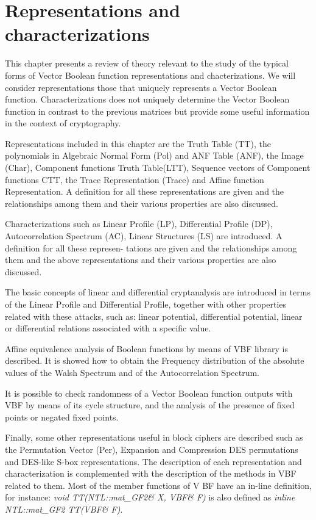 \chapter{Representations and characterizations}

This chapter presents a review of theory relevant to the study of the typical forms of Vector Boolean function representations and chacterizations. We will consider representations those that uniquely represents a Vector Boolean function. Characterizations does not uniquely determine the Vector Boolean function in contrast to the previous matrices but provide some useful information in the context of cryptography.

Representations included in this chapter are the Truth Table (TT), the polynomials in Algebraic Normal Form (Pol) and ANF Table (ANF), the Image (Char), Component functions Truth Table(LTT), Sequence vectors of Component functions CTT, the Trace Representation (Trace) and Affine function Representation. A definition for all these representations are given and the relationships among them and their various properties are also discussed.

Characterizations such as Linear Profile (LP), Differential Profile (DP), Autocorrelation Spectrum (AC), Linear Structures (LS) are introduced. A definition for all these represen- tations are given and the relationships among them and the above representations and their various properties are also discussed.

The basic concepts of linear and differential cryptanalysis are introduced in terms of the Linear Profile and Differential Profile, together with other properties related with these attacks, such as: linear potential, differential potential, linear or differential relations associated with a specific value.

Affine equivalence analysis of Boolean functions by means of VBF library is described. It is showed how to obtain the Frequency distribution of the absolute values of the Walsh Spectrum and of the Autocorrelation Spectrum.

It is possible to check randomness of a Vector Boolean function outputs with VBF by means of its cycle structure, and the analysis of the presence of fixed points or negated fixed points.

Finally, some other representations useful in block ciphers are described such as the Permutation Vector (Per), Expansion and Compression DES permutations and DES-like S-box representations. The description of each representation and characterization is complemented with the description of the methods in VBF related to them. Most of the member functions of V BF have an in-line definition, for instance: \textsl{void TT(NTL::mat\_GF2\& X, VBF\& F)} is also defined as \textsl{inline NTL::mat\_GF2 TT(VBF\& F)}. 

